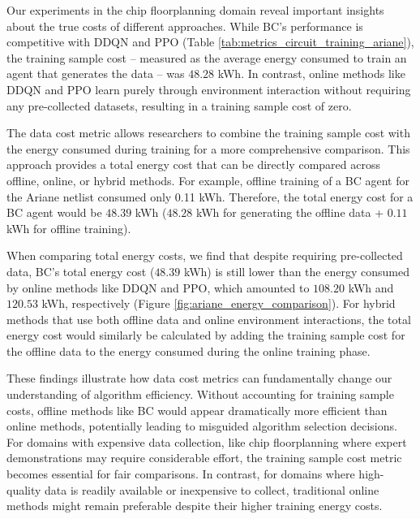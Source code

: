 Our experiments in the chip floorplanning domain reveal important insights about the true costs of different approaches. While BC's performance is competitive with DDQN and PPO (Table \ref{tab:metrics_circuit_training_ariane}), the training sample cost -- measured as the average energy consumed to train an agent that generates the data -- was $48.28$ kWh. In contrast, online methods like DDQN and PPO learn purely through environment interaction without requiring any pre-collected datasets, resulting in a training sample cost of zero.

The data cost metric allows researchers to combine the training sample cost with the energy consumed during training for a more comprehensive comparison. This approach provides a total energy cost that can be directly compared across offline, online, or hybrid methods. For example, offline training of a BC agent for the Ariane netlist consumed only 0.11 kWh. Therefore, the total energy cost for a BC agent would be $48.39$ kWh ($48.28$ kWh for generating the offline data + $0.11$ kWh for offline training).

When comparing total energy costs, we find that despite requiring pre-collected data, BC's total energy cost ($48.39$ kWh) is still lower than the energy consumed by online methods like DDQN and PPO, which amounted to $108.20$ kWh and $120.53$ kWh, respectively (Figure \ref{fig:ariane_energy_comparison}). For hybrid methods that use both offline data and online environment interactions, the total energy cost would similarly be calculated by adding the training sample cost for the offline data to the energy consumed during the online training phase.

These findings illustrate how data cost metrics can fundamentally change our understanding of algorithm efficiency. Without accounting for training sample costs, offline methods like BC would appear dramatically more efficient than online methods, potentially leading to misguided algorithm selection decisions. For domains with expensive data collection, like chip floorplanning where expert demonstrations may require considerable effort, the training sample cost metric becomes essential for fair comparisons. In contrast, for domains where high-quality data is readily available or inexpensive to collect, traditional online methods might remain preferable despite their higher training energy costs. 

